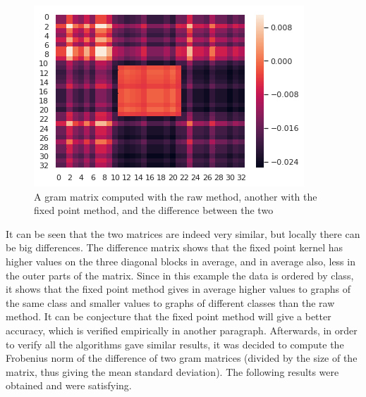 \documentclass{article}
\theoremstyle{definition}
\begin{document}
\begin{figure}[!htb]
\begin{multicols}{3}
		\includegraphics[width=\linewidth]{data/gram/gram5.png}\par
	\end{multicols}
	\caption{A gram matrix computed with the raw method, another with the fixed point method, and the difference between the two}
\end{figure}
It can be seen that the two matrices are indeed very similar, but locally there can be big differences. The difference matrix shows that the fixed point kernel has higher values on the three diagonal blocks in average, and in average also, less in the outer parts of the matrix. Since in this example the data is ordered by class, it shows that the fixed point method gives in average higher values to graphs of the same class and smaller values to graphs of different classes than the raw method. It can be conjecture that the fixed point method will give a better accuracy, which is verified empirically in another paragraph.
Afterwards, in order to verify all the algorithms gave similar results, it was decided to compute the Frobenius norm of the difference of two gram matrices (divided by the size of the matrix, thus giving the mean standard deviation). The following results were obtained and were satisfying.
\end{document}

